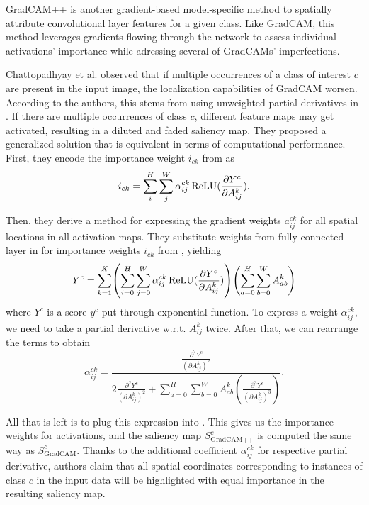 GradCAM++ \cite{grad-cam-pp} is another gradient-based model-specific method to spatially attribute convolutional layer features for a given class.
Like GradCAM, this method leverages gradients flowing through the network to assess individual activations' importance while adressing several of GradCAMs' imperfections.

Chattopadhyay et al. \cite{grad-cam-pp} observed that if multiple occurrences of a class of interest $c$ are present in the input image, the localization capabilities of GradCAM worsen.
According to the authors, this stems from using unweighted partial derivatives in .
If there are multiple occurrences of class $c$, different feature maps may get activated, resulting in a diluted and faded saliency map.
They proposed a generalized solution that is equivalent in terms of computational performance.
First, they encode the importance weight $i_{ck}$ from  as
\begin{equation}\label{eq:grad-cam-pp-weights}
    i_{ck} = \sum_i^H \sum_j^W \alpha^{ck}_{ij} \operatorname{ReLU}(\frac{\partial Y^c}{\partial A^k_{ij}}).
\end{equation}

Then, they derive a method for expressing the gradient weights $a^{ck}_{ij}$ for all spatial locations in all activation maps.
They substitute weights from fully connected layer in  for importance weights $i_{ck}$ from , yielding
\begin{equation}\label{eq:grad-cam-pp-score}
    Y^c = \sum_{k=1}^K \left( \sum_{i=0}^H \sum_{j=0}^W \alpha^{ck}_{ij} \relu(\frac{\partial Y^c}{\partial A^k_{ij}}) \right) \left( \sum_{a=0}^H \sum_{b=0}^W A^{k}_{ab} \right)
\end{equation}
where $Y^c$ is a score $y^c$ put through exponential function. To express a weight $\alpha^{ck}_{ij}$, we need to take a partial derivative w.r.t. $A^k_{ij}$ twice. After that, we can rearrange the terms to obtain
\begin{equation}
    \alpha^{ck}_{ij} = \frac{\frac{\partial^2 Y^c}{(\partial A^k_{ij})^2}}{2\frac{\partial^2 Y^c}{(\partial A^k_{ij})^2} + \sum_{a=0}^H \sum_{b=0}^W A^{k}_{ab} \left( \frac{\partial^3 Y^c}{(\partial A^k_{ij})^3} \right)}.
\end{equation}

All that is left is to plug this expression into .
This gives us the importance weights for activations, and the saliency map $S^c_{\text{GradCAM++}}$ is computed the same way as $S^c_{\text{GradCAM}}$.
Thanks to the additional coefficient $\alpha^{ck}_{ij}$ for respective partial derivative, authors claim that all spatial coordinates corresponding to instances of class $c$ in the input data will be highlighted with equal importance in the resulting saliency map.

